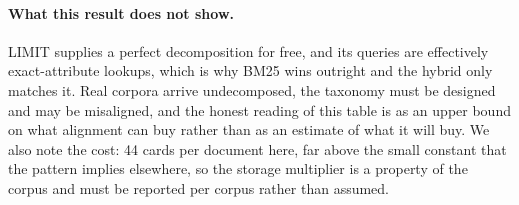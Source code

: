 \paragraph{What this result does not show.}
LIMIT supplies a perfect decomposition for free, and its queries are effectively
exact-attribute lookups, which is why BM25 wins outright and the hybrid only
matches it. Real corpora arrive undecomposed, the taxonomy must be designed and
may be misaligned, and the honest reading of this table is as an upper bound on
what alignment can buy rather than as an estimate of what it will buy. We also
note the cost: 44 cards per document here, far above the small constant that the
pattern implies elsewhere, so the storage multiplier is a property of the corpus
and must be reported per corpus rather than assumed.
